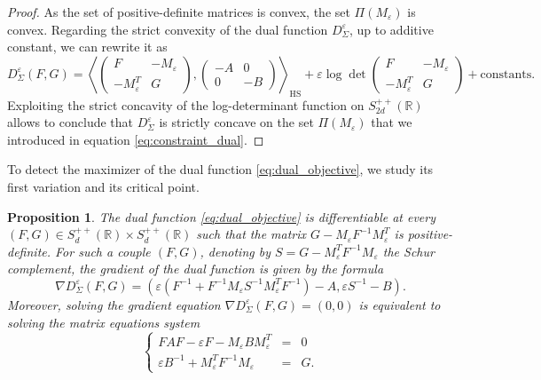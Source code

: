 \documentclass[]{article}
\DeclareMathOperator{\HS}{HS}
\numberwithin{equation}{section}
\theoremstyle{plain}
\newtheorem{prop}{Proposition}[section]
\begin{document}
\begin{proof}
	As the set of positive-definite matrices is convex, the set $\Pi(M_\varepsilon)$ is convex. Regarding the strict convexity of the dual function $D_\Sigma^{\varepsilon}$, up to additive constant, we can rewrite it as 
	\begin{equation*}
		D_\Sigma^{\varepsilon}(F,G) = \left\langle \begin{pmatrix} 
			F & -M_\varepsilon \\
			-M_{\varepsilon}^T & G
		\end{pmatrix}, \begin{pmatrix}
		- A & 0 \\
		0 & -B
	\end{pmatrix}  \right\rangle_{\HS}  +   \varepsilon \log  \det \begin{pmatrix}
	F   & -M_{\varepsilon}    \\
	-M_{\varepsilon} ^T  &    G 
\end{pmatrix} + \text{constants}.
	\end{equation*}
Exploiting the strict concavity of the log-determinant function on $S_{2d}^{++}(\mathbb{R})$ \citep[p.~42,~Cor.~1.4.2]{bakonyi2011matrix} allows to conclude that $D_\Sigma^{\varepsilon}$ is strictly concave on the set $\Pi(M_\varepsilon)$ that we introduced in equation \eqref{eq:constraint_dual}.
\end{proof} 

To detect the maximizer of the dual function \eqref{eq:dual_objective}, we study its first variation and its critical point.

\begin{prop}\label{prop:grad_dual}
    The dual function \eqref{eq:dual_objective} is differentiable at every $(F,G) \in S_d^{++}(\mathbb{R}) \times S_d^{++}(\mathbb{R})$ such that the matrix $G-M_\varepsilon F^{-1} M_\varepsilon^{T}$ is positive-definite. For such a couple $(F,G)$, denoting by $S = G-M_{\varepsilon}^{T}F^{-1}M_{\varepsilon}$ the Schur complement, the gradient of the dual function is given by the formula
    \begin{equation}\label{eq:grad_dual}
        \nabla D_{\Sigma}^\varepsilon(F,G) = (\varepsilon (F^{-1}+ F^{-1}M_{\varepsilon}S^{-1}M_{\varepsilon}^TF^{-1})-A, \varepsilon S^{-1}-B).
    \end{equation}
    Moreover, solving the gradient equation $\nabla D_{\Sigma}^\varepsilon(F,G) = (0,0)$ is equivalent to solving the matrix equations system
    \begin{equation}\label{eq:system_dual}
        \left\{ 
        \begin{array}{ccc}
            FAF - \varepsilon F - M_{\varepsilon}BM_{\varepsilon}^T& = & 0 \\
             \varepsilon B^{-1} + M_{\varepsilon}^TF^{-1}M_{\varepsilon}& = & G.
        \end{array}
        \right.
    \end{equation}
\end{prop}
\end{document}
